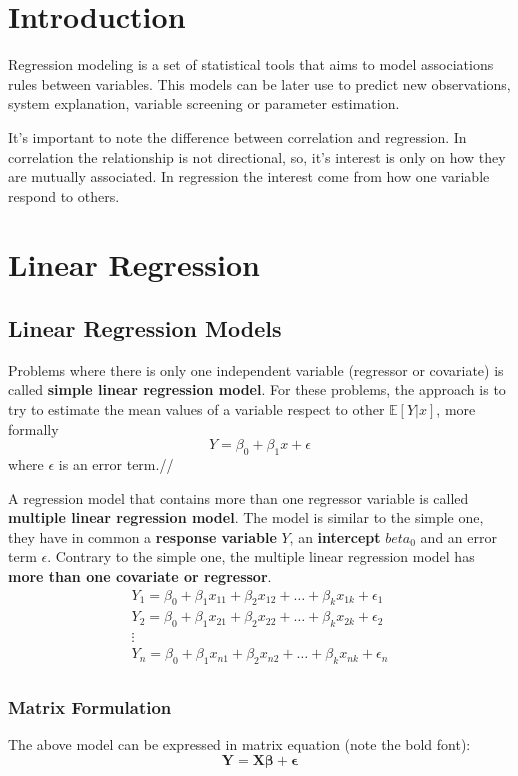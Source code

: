 \section{Introduction}
Regression modeling is a set of statistical tools that aims to model associations
rules between variables. This models can be later use to predict new observations,
system explanation, variable screening or parameter estimation.

It's important to note the difference between correlation and regression. In correlation
the relationship is not directional, so, it's interest is only on how they are mutually
associated. In regression the interest come from how one variable respond to others.

\section{Linear Regression}
\subsection{Linear Regression Models}
Problems where there is only one independent variable (regressor or covariate) is called 
\textbf{simple linear regression model}. For these problems, the approach is to try to 
estimate the mean values of a variable respect to other $\mathbb{E}[Y|x]$, more formally
\begin{equation}
    Y = \beta_0 + \beta_1 x + \epsilon
\end{equation}
where $\epsilon$ is an error term.//

A regression model that contains more than one regressor variable is called
\textbf{multiple linear regression model}. The model is similar to the simple
one, they have in common a \textbf{response variable} $Y$, an \textbf{intercept}
$beta_0$ and an error term $\epsilon$. Contrary to the simple one, the multiple linear
regression model has \textbf{more than one covariate or regressor}.
\begin{gather*}
    Y_1 = \beta_0 + \beta_1 x_{11} + \beta_2 x_{12} + \dots + \beta_k x_{1k} + \epsilon_1\\
    Y_2 = \beta_0 + \beta_1 x_{21} + \beta_2 x_{22} + \dots + \beta_k x_{2k} + \epsilon_2\\
    \vdots\\
    Y_n = \beta_0 + \beta_1 x_{n1} + \beta_2 x_{n2} + \dots + \beta_k x_{nk} + \epsilon_n\\
\end{gather*}

\subsubsection{Matrix Formulation}
The above model can be expressed in matrix equation (note the bold font):
\begin{equation}
    \bm{Y} = \bm{X}\bm{\beta} + \bm{\epsilon}
\end{equation}

